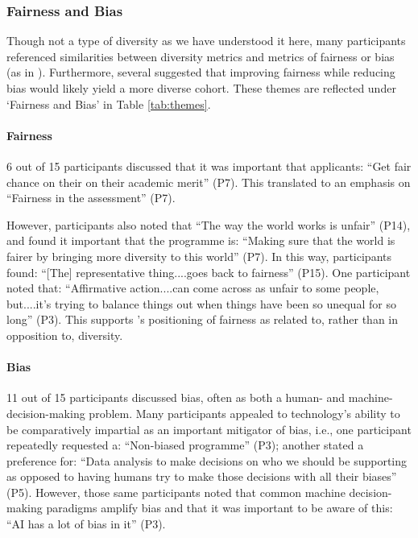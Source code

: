 \subsubsection{Fairness and Bias}
Though not a type of diversity as we have understood it here, many participants referenced similarities between diversity metrics and metrics of fairness or bias (as in \textcite{zhao2023fairness}). Furthermore, several suggested that improving fairness while reducing bias would likely yield a more diverse cohort. These themes are reflected under `Fairness and Bias' in Table \ref{tab:themes}.

\paragraph{Fairness}
6 out of 15 participants discussed that it was important that applicants: ``Get fair chance on their on their academic merit'' (P7). This translated to an emphasis on ``Fairness in the assessment'' (P7).

However, participants also noted that ``The way the world works is unfair'' (P14), and found it important that the programme is: ``Making sure that the world is fairer by bringing more diversity to this world'' (P7). In this way, participants found: ``[The] representative thing....goes back to fairness'' (P15). One participant noted that: ``Affirmative action....can come across as unfair to some people, but....it's trying to balance things out when things have been so unequal for so long'' (P3). This supports \textcite{zhao2023fairness}'s positioning of fairness as related to, rather than in opposition to, diversity. 

\paragraph{Bias}
11 out of 15 participants discussed bias, often as both a human- and machine-decision-making problem. Many participants appealed to technology's ability to be comparatively impartial as an important mitigator of bias, i.e., one participant repeatedly requested a: ``Non-biased programme'' (P3); another stated a preference for: ``Data analysis to make decisions on who we should be supporting as opposed to having humans try to make those decisions with all their biases'' (P5). However, those same participants noted that common machine decision-making paradigms amplify bias and that it was important to be aware of this: ``AI has a lot of bias in it'' (P3).

